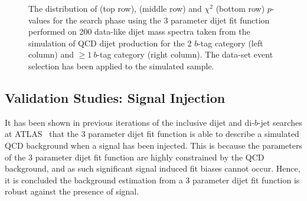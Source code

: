 \begin{figure}[!htb]
\begin{center}
  \end{center}
  \caption{
    The distribution of \bh{} (top row),  \dhunt{} (middle row) and $\chi^{2}$ (bottom row) \mbox{$p$-value}s for
    the search phase using the 3 parameter dijet fit function performed on
    200 data-like dijet mass spectra taken from the simulation of QCD dijet production
    for the 2 $b$-tag category (left column) and $\geq1~b$-tag category (right column).
    The \summer{} data-set event selection has been applied to the simulated sample.
  \label{fig:pValueHists}}
\end{figure}


\subsection{Validation Studies: Signal Injection}
\label{sec:bkg-summer_sigInj}

It has been shown in previous iterations of the inclusive dijet and di-$b$-jet searches at ATLAS~\cite{dijet-mori16_paper,dibjet-mori16_paper}
that the 3 parameter dijet fit function is able to describe a simulated QCD background when a signal has been injected.
This is because the parameters of the 3 parameter dijet fit function are highly constrained by the QCD background,
and as such significant signal induced fit biases cannot occur.
Hence, it is concluded the background estimation from a 3 parameter dijet fit function is robust against the presence of signal.

